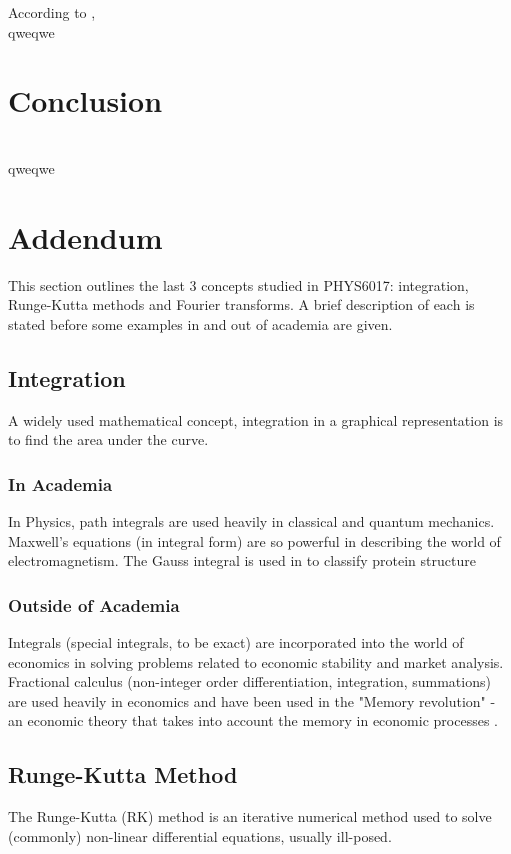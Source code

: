 \documentclass[a4paper, 10pt, conference]{ieeeconf}      %
\begin{document}
According to \cite{Georgoula2015}, 
\\qweqwe
\section{Conclusion}
\\qweqwe
\section{Addendum}{\label{addendum}}
This section outlines the last 3 concepts studied in PHYS6017: integration, Runge-Kutta methods and Fourier transforms. A brief description of each is stated before some examples in and out of academia are given.
\\
\subsection{Integration}
A widely used mathematical concept, integration in a graphical representation is to find the area under the curve.
\\
\subsubsection{In Academia}
In Physics, path integrals are used heavily in classical and quantum mechanics. Maxwell's equations (in integral form) are so powerful in describing the world of electromagnetism. The Gauss integral is used in \cite{Rogen2003} to classify protein structure 
\\
\subsubsection{Outside of Academia}
Integrals (special integrals, to be exact) are incorporated into the world of economics \cite{Sherdor2023} in solving problems related to economic stability and market analysis. Fractional calculus (non-integer order differentiation, integration, summations) \cite{Ross1977} are used heavily in economics and have been used in the "Memory revolution" - an economic theory that takes into account the memory in economic processes \cite{Tarasov2019}. 
\\
\subsection{Runge-Kutta Method} %
The Runge-Kutta (RK) method is an iterative numerical method used to solve (commonly) non-linear differential equations, usually ill-posed. 
\\
\end{document}
